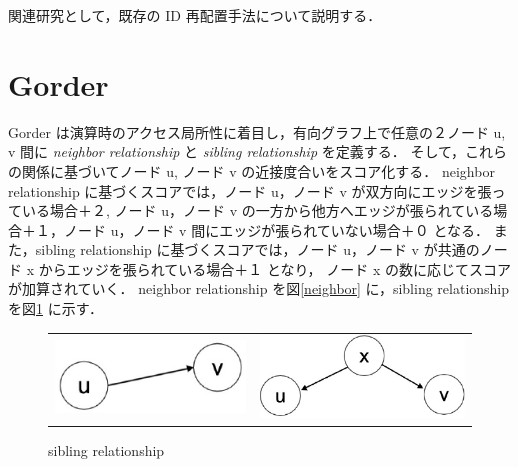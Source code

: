 関連研究として，既存の ID 再配置手法について説明する．
\section{Gorder}
Gorder\cite{wei2016speedup} は演算時のアクセス局所性に着目し，有向グラフ上で任意の２ノード u, v 間に \textit{neighbor relationship} と \textit{sibling relationship} を定義する．
そして，これらの関係に基づいてノード u, ノード v の近接度合いをスコア化する．
neighbor relationship に基づくスコアでは，ノード u，ノード v が双方向にエッジを張っている場合＋２,
ノード u，ノード v の一方から他方へエッジが張られている場合＋１，ノード u，ノード v 間にエッジが張られていない場合＋０ となる．
また，sibling relationship に基づくスコアでは，ノード u，ノード v が共通のノード x からエッジを張られている場合＋１ となり，
ノード x の数に応じてスコアが加算されていく．
neighbor relationship を図\ref{neighbor} に，sibling relationship を図\ref{sibling} に示す． 
\begin{figure}[t]
  \begin{tabular}{cc}
    \begin{minipage}[t]{0.45\hsize}
      \centering
      \includegraphics[width=6.5cm]{./figure/neighbor.pdf}
      \caption{neighbor relationship}
      \label{neighbor}
    \end{minipage} &
    \begin{minipage}[t]{0.45\hsize}
      \centering
      \includegraphics[width=7cm]{./figure/sibling.pdf}
      \caption{sibling relationship}
      \label{sibling}
    \end{minipage}
  \end{tabular}
\end{figure}
